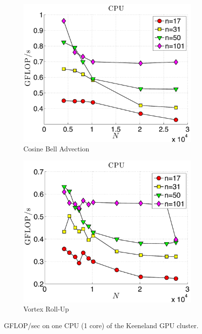 \begin{figure}
\centering
\begin{subfigure}[t]{0.425\textwidth}
\centering
\includegraphics[width=\textwidth]{../figures/keeneland_results/alltoallv_cosine/gflops_cpu_1proc_oneWarpPerStencil.pdf}
\caption{Cosine Bell Advection}
\label{fig:gflops_cpu_1proc_keeneland_cosine}
\end{subfigure} 
\quad
\begin{subfigure}[t]{0.425\textwidth}
\centering
\includegraphics[width=\textwidth]{../figures/keeneland_results/alltoallv_vortex/gflops_cpu_1proc_oneWarpPerStencil.pdf}
\caption{Vortex Roll-Up}
\label{fig:gflops_cpu_1proc_keeneland_vortex}
\end{subfigure}
\caption{GFLOP/sec on one CPU (1 core) of the Keeneland GPU cluster.}
\label{fig:gflops_cpu_1proc_keeneland}
\end{figure}

